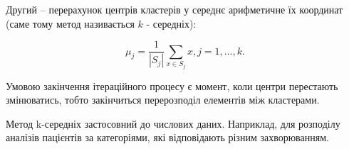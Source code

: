 Другий -- перерахунок центрів кластерів у середнє арифметичне їх координат (саме тому метод називається $k$ - середніх):


\begin{equation}
 \mu_j = \frac{1}{|S_j|} \sum_{x \in S_j} x, j = 1, \ldots, k.
\end{equation}

Умовою закінчення ітераційного процесу є момент, коли центри перестають змінюватись, тобто закінчиться перерозподіл елементів між кластерами.

Метод k-середніх застосовний до числових даних. Наприклад, для розподілу аналізів пацієнтів за категоріями, які відповідають різним захворюванням. 



